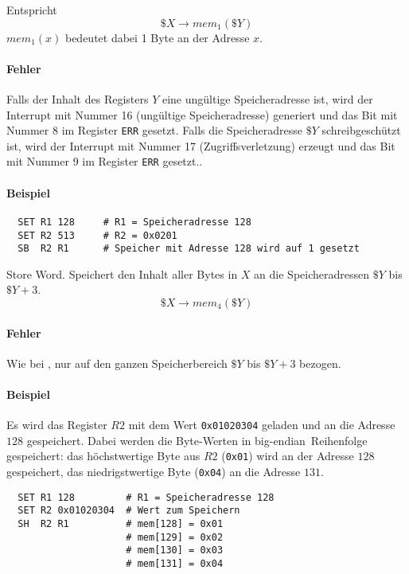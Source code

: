Entspricht
\[
    \$X \to mem_{1} (\$Y)
\]
$mem_{1}(x)$ bedeutet dabei 1 Byte an der Adresse $x$.

\paragraph{Fehler}
Falls der Inhalt des Registers $Y$ eine ungültige Speicheradresse ist, wird der
Interrupt mit Nummer 16 (ungültige Speicheradresse) generiert und das Bit mit
Nummer 8 im Register \texttt{ERR} gesetzt. Falls die Speicheradresse $\$Y$
schreibgeschützt ist, wird der Interrupt mit Nummer 17 (Zugriffsverletzung)
erzeugt und das Bit mit Nummer 9 im Register \texttt{ERR} gesetzt..

\paragraph{Beispiel}
\begin{lstlisting}
  SET R1 128     # R1 = Speicheradresse 128
  SET R2 513     # R2 = 0x0201
  SB  R2 R1      # Speicher mit Adresse 128 wird auf 1 gesetzt
\end{lstlisting}




\glqq Store Word\grqq.
Speichert den Inhalt aller Bytes in $X$ an die Speicheradressen $\$Y$ bis 
$\$Y + 3$.
\[
    \$X \to mem_{4}(\$Y)
\]

\paragraph{Fehler}
Wie bei , nur auf den ganzen Speicherbereich $\$Y$ bis $\$Y + 3$
bezogen.


\paragraph{Beispiel}
Es wird das Register $R2$ mit dem Wert \texttt{0x01020304} geladen und an die
Adresse $128$ gespeichert. Dabei werden die Byte-Werten in 
\glqq big-endian\grqq\ Reihenfolge gespeichert: das höchstwertige Byte aus $R2$
(\texttt{0x01}) wird an der Adresse $128$ gespeichert, das niedrigstwertige
Byte (\texttt{0x04}) an die Adresse $131$.

\begin{lstlisting}
  SET R1 128         # R1 = Speicheradresse 128
  SET R2 0x01020304  # Wert zum Speichern
  SH  R2 R1          # mem[128] = 0x01
                     # mem[129] = 0x02
                     # mem[130] = 0x03
                     # mem[131] = 0x04
\end{lstlisting}




